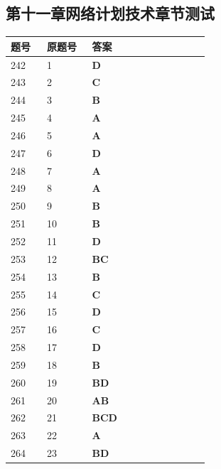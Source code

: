 \documentclass[UTF8,fontset=windows,11pt]{ctexart}
\begin{document}
\subsection*{第十一章网络计划技术章节测试}
\begin{longtable}{p{0.16\linewidth}p{0.2\linewidth}p{0.52\linewidth}}
\textbf{\textcolor{examnavy}{题号}} & \textbf{\textcolor{examnavy}{原题号}} & \textbf{\textcolor{answergreen}{答案}} \\
\hline
242 & 1 & \textbf{\textcolor{answergreen}{D}} \\
243 & 2 & \textbf{\textcolor{answergreen}{C}} \\
244 & 3 & \textbf{\textcolor{answergreen}{B}} \\
245 & 4 & \textbf{\textcolor{answergreen}{A}} \\
246 & 5 & \textbf{\textcolor{answergreen}{A}} \\
247 & 6 & \textbf{\textcolor{answergreen}{D}} \\
248 & 7 & \textbf{\textcolor{answergreen}{A}} \\
249 & 8 & \textbf{\textcolor{answergreen}{A}} \\
250 & 9 & \textbf{\textcolor{answergreen}{B}} \\
251 & 10 & \textbf{\textcolor{answergreen}{B}} \\
252 & 11 & \textbf{\textcolor{answergreen}{D}} \\
253 & 12 & \textbf{\textcolor{answergreen}{BC}} \\
254 & 13 & \textbf{\textcolor{answergreen}{B}} \\
255 & 14 & \textbf{\textcolor{answergreen}{C}} \\
256 & 15 & \textbf{\textcolor{answergreen}{D}} \\
257 & 16 & \textbf{\textcolor{answergreen}{C}} \\
258 & 17 & \textbf{\textcolor{answergreen}{D}} \\
259 & 18 & \textbf{\textcolor{answergreen}{B}} \\
260 & 19 & \textbf{\textcolor{answergreen}{BD}} \\
261 & 20 & \textbf{\textcolor{answergreen}{AB}} \\
262 & 21 & \textbf{\textcolor{answergreen}{BCD}} \\
263 & 22 & \textbf{\textcolor{answergreen}{A}} \\
264 & 23 & \textbf{\textcolor{answergreen}{BD}} \\
\end{longtable}
\end{document}
